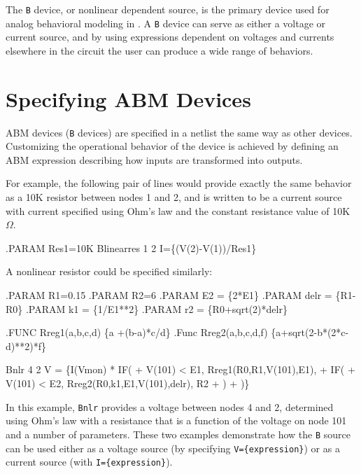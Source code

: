 The \verb+B+
 device, or nonlinear dependent source, is
the primary device used for analog behavioral modeling in \Xyce{}.  A
\verb+B+ device can serve as either a voltage or current source, and by using
expressions dependent on voltages and currents elsewhere in the
circuit the user can produce a wide range of behaviors.

\section{Specifying ABM Devices}
\label{ABM_Devices}

ABM devices (\verb+B+
devices) are specified in a netlist the same way as other devices.  Customizing
the operational behavior of the device is achieved by defining an ABM
expression describing how inputs are transformed into outputs.

For example, the following pair of lines would provide exactly the same
behavior as a 10K resistor between nodes 1 and 2, and is
written to be a current source with current specified using Ohm's
law and the constant resistance value of 10K $\Omega$.

\begin{vquote}
.PARAM Res1=10K
Blinearres 1 2 I=\{(V(2)-V(1))/Res1\}
\end{vquote}

A nonlinear resistor could be specified similarly:
\begin{vquote}
.PARAM R1=0.15
.PARAM R2=6
.PARAM E2 = \{2*E1\}
.PARAM delr = \{R1-R0\}
.PARAM k1 = \{1/E1**2\}
.PARAM r2 = \{R0+sqrt(2)*delr\}

.FUNC Rreg1(a,b,c,d) \{a +(b-a)*c/d\}
.Func Rreg2(a,b,c,d,f) \{a+sqrt(2-b*(2*c-d)**2)*f\}

Bnlr 4 2 V = \{I(Vmon) * IF(
+ V(101) < E1, Rreg1(R0,R1,V(101),E1),
+ IF(
+ V(101) < E2, Rreg2(R0,k1,E1,V(101),delr), R2
+ )
+ )\}
\end{vquote}

In this example, \verb+Bnlr+ provides a voltage between nodes 4 and 2,
determined using Ohm's law with a resistance that is a function of the
voltage on node 101 and a number of parameters.  These two examples
demonstrate how the \verb+B+ source can be used either as a voltage
source (by specifying \verb+V={expression}+) or as a current source
(with \verb+I={expression}+).

